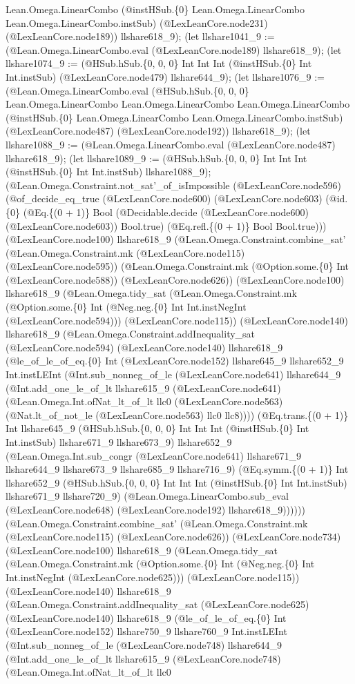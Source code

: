 \documentclass[11pt]{article}
\begin{document}
Lean.Omega.LinearCombo (@instHSub.\{0\} Lean.Omega.LinearCombo Lean.Omega.LinearCombo.instSub) (@LexLeanCore.node231) (@LexLeanCore.node189)) llshare618\_9); (let llshare1041\_9 := (@Lean.Omega.LinearCombo.eval (@LexLeanCore.node189) llshare618\_9); (let llshare1074\_9 := (@HSub.hSub.\{0, 0, 0\} Int Int Int (@instHSub.\{0\} Int Int.instSub) (@LexLeanCore.node479) llshare644\_9); (let llshare1076\_9 := (@Lean.Omega.LinearCombo.eval (@HSub.hSub.\{0, 0, 0\} Lean.Omega.LinearCombo Lean.Omega.LinearCombo Lean.Omega.LinearCombo (@instHSub.\{0\} Lean.Omega.LinearCombo Lean.Omega.LinearCombo.instSub) (@LexLeanCore.node487) (@LexLeanCore.node192)) llshare618\_9); (let llshare1088\_9 := (@Lean.Omega.LinearCombo.eval (@LexLeanCore.node487) llshare618\_9); (let llshare1089\_9 := (@HSub.hSub.\{0, 0, 0\} Int Int Int (@instHSub.\{0\} Int Int.instSub) llshare1088\_9); (@Lean.Omega.Constraint.not\_sat'\_of\_isImpossible (@LexLeanCore.node596) (@of\_decide\_eq\_true (@LexLeanCore.node600) (@LexLeanCore.node603) (@id.\{0\} (@Eq.\{(0 + 1)\} Bool (@Decidable.decide (@LexLeanCore.node600) (@LexLeanCore.node603)) Bool.true) (@Eq.refl.\{(0 + 1)\} Bool Bool.true))) (@LexLeanCore.node100) llshare618\_9 (@Lean.Omega.Constraint.combine\_sat' (@Lean.Omega.Constraint.mk (@LexLeanCore.node115) (@LexLeanCore.node595)) (@Lean.Omega.Constraint.mk (@Option.some.\{0\} Int (@LexLeanCore.node588)) (@LexLeanCore.node626)) (@LexLeanCore.node100) llshare618\_9 (@Lean.Omega.tidy\_sat (@Lean.Omega.Constraint.mk (@Option.some.\{0\} Int (@Neg.neg.\{0\} Int Int.instNegInt (@LexLeanCore.node594))) (@LexLeanCore.node115)) (@LexLeanCore.node140) llshare618\_9 (@Lean.Omega.Constraint.addInequality\_sat (@LexLeanCore.node594) (@LexLeanCore.node140) llshare618\_9 (@le\_of\_le\_of\_eq.\{0\} Int (@LexLeanCore.node152) llshare645\_9 llshare652\_9 Int.instLEInt (@Int.sub\_nonneg\_of\_le (@LexLeanCore.node641) llshare644\_9 (@Int.add\_one\_le\_of\_lt llshare615\_9 (@LexLeanCore.node641) (@Lean.Omega.Int.ofNat\_lt\_of\_lt llc0 (@LexLeanCore.node563) (@Nat.lt\_of\_not\_le (@LexLeanCore.node563) llc0 llc8)))) (@Eq.trans.\{(0 + 1)\} Int llshare645\_9 (@HSub.hSub.\{0, 0, 0\} Int Int Int (@instHSub.\{0\} Int Int.instSub) llshare671\_9 llshare673\_9) llshare652\_9 (@Lean.Omega.Int.sub\_congr (@LexLeanCore.node641) llshare671\_9 llshare644\_9 llshare673\_9 llshare685\_9 llshare716\_9) (@Eq.symm.\{(0 + 1)\} Int llshare652\_9 (@HSub.hSub.\{0, 0, 0\} Int Int Int (@instHSub.\{0\} Int Int.instSub) llshare671\_9 llshare720\_9) (@Lean.Omega.LinearCombo.sub\_eval (@LexLeanCore.node648) (@LexLeanCore.node192) llshare618\_9)))))) (@Lean.Omega.Constraint.combine\_sat' (@Lean.Omega.Constraint.mk (@LexLeanCore.node115) (@LexLeanCore.node626)) (@LexLeanCore.node734) (@LexLeanCore.node100) llshare618\_9 (@Lean.Omega.tidy\_sat (@Lean.Omega.Constraint.mk (@Option.some.\{0\} Int (@Neg.neg.\{0\} Int Int.instNegInt (@LexLeanCore.node625))) (@LexLeanCore.node115)) (@LexLeanCore.node140) llshare618\_9 (@Lean.Omega.Constraint.addInequality\_sat (@LexLeanCore.node625) (@LexLeanCore.node140) llshare618\_9 (@le\_of\_le\_of\_eq.\{0\} Int (@LexLeanCore.node152) llshare750\_9 llshare760\_9 Int.instLEInt (@Int.sub\_nonneg\_of\_le (@LexLeanCore.node748) llshare644\_9 (@Int.add\_one\_le\_of\_lt llshare615\_9 (@LexLeanCore.node748) (@Lean.Omega.Int.ofNat\_lt\_of\_lt llc0 
\end{document}
